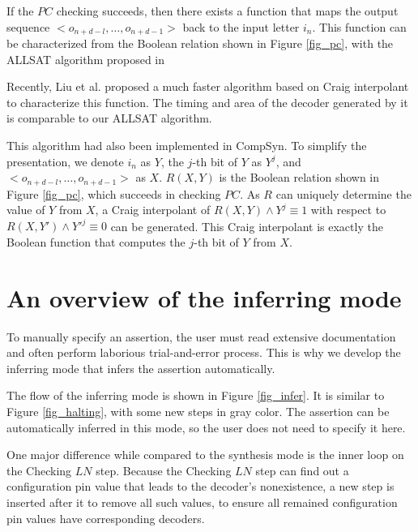 \documentclass[runningheads,a4paper]{llncs}
\begin{document}
If the $PC$ checking succeeds,
then there exists a function that maps the output sequence $<o_{n+d-l},\dots,o_{n+d-1}>$ back to the input letter $i_n$.
This function can be characterized from the Boolean relation shown in Figure \ref{fig_pc},
with the ALLSAT algorithm proposed in 

Recently,
Liu et al.  proposed a much faster algorithm based on Craig interpolant to characterize this function.
The timing and area of the decoder generated by it is comparable to our ALLSAT algorithm.

This algorithm had also been implemented in CompSyn.
To simplify the presentation,
we denote $i_n$ as $Y$,
the $j$-th bit of $Y$ as $Y^{j}$,
and $<o_{n+d-l},\dots,o_{n+d-1}>$ as $X$.
$R(X,Y)$ is the Boolean relation shown in Figure \ref{fig_pc},
which succeeds in checking $PC$.
As $R$ can uniquely determine the value of $Y$ from $X$,
a Craig interpolant of $R(X,Y)\wedge Y^{j}\equiv 1$ with respect to $R(X,Y')\wedge Y'^{j} \equiv 0$ can be generated.
This Craig interpolant is exactly the Boolean function that computes the $j$-th bit of $Y$ from $X$.



\section{An overview of the inferring mode}\label{sec_infer}
To manually specify an assertion,
the user must read extensive documentation
and often perform laborious trial-and-error process.
This is why we develop the inferring mode that infers the assertion automatically.

The flow of the inferring mode is shown in Figure \ref{fig_infer}.
It is similar to Figure \ref{fig_halting},
with some new steps in gray color.
The assertion can be automatically inferred in this mode,
so the user does not need to specify it here.

One major difference while compared to the synthesis mode is the inner loop on the Checking $LN$ step.
Because the Checking $LN$ step can find out a configuration pin value that leads to the decoder's nonexistence,
a new step is inserted after it to remove all such values,
to ensure all remained configuration pin values have corresponding decoders.
\end{document}
